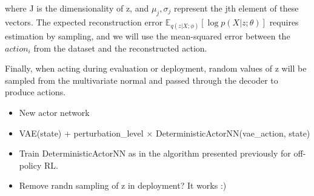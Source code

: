 where J is the dimensionality of z, and $\mu_j,\sigma_j$ represent the jth element of these vectors.
The expected reconstruction error 
$\mathbb E_{q(z|X;\phi)} [\log p(X|z; \theta)]$
requires estimation by sampling, and we will use the mean-squared error between the $action_i$ from the dataset and the reconstructed
action.

Finally, when acting during evaluation or deployment, random values of z will be sampled from the multivariate normal
and passed through the decoder to produce actions.


\begin{itemize}
    \item New actor network
    \item VAE(state) + perturbation\_level $\times$ DeterministicActorNN(vae\_action, state)
    \item Train DeterministicActorNN as in the algorithm presented previously for off-policy RL.
    \item Remove randn sampling of z in deployment? It works :)
\end{itemize}

